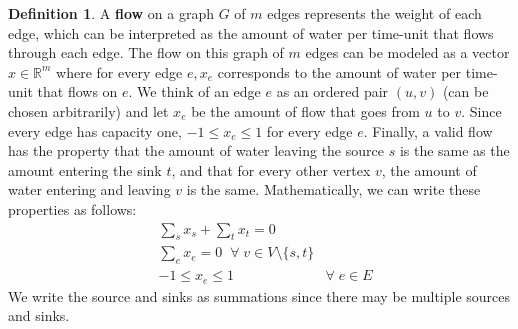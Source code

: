\documentclass[a4paper, 12pt]{report}
\theoremstyle{remark}
\theoremstyle{definition}
\newtheorem{definition}{Definition}[section]
\begin{document}
\begin{definition}
A \textbf{flow} on a graph $G$ of $m$ edges represents the weight of each edge, which can be interpreted as the amount of water per time-unit that flows through each edge. The flow on this graph of $m$ edges can be modeled as a vector $x \in \mathbb{R}^m$ where for every edge $e, x_e$ corresponds to the amount of water per time-unit that flows on $e$. We think of an edge $e$ as an ordered pair $(u, v)$ (can be chosen arbitrarily) and let $x_e$ be the amount of flow that goes from $u$ to $v$. Since every edge has capacity one, $-1 \leq x_e \leq 1$ for every edge $e$. Finally, a valid flow has the property that the amount of water leaving the source $s$ is the same as the amount entering the sink $t$, and that for every other vertex $v$, the amount of water entering and leaving $v$ is the same. Mathematically, we can write these properties as follows:  
\begin{align*}
    & \sum_{s} x_s + \sum_t x_t = 0 \\
    & \sum_e x_e = 0 \;\; \forall\; v \in V \setminus \{s, t\} \\
    & -1 \leq x_e \leq 1 & \forall\; e \in E
\end{align*}
We write the source and sinks as summations since there may be multiple sources and sinks. 
\end{definition} 
\end{document}
